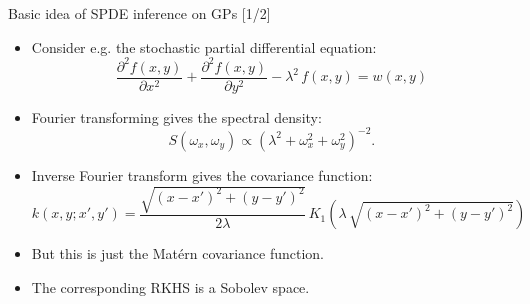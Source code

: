 \documentclass[first=dgreen,second=purple,presentation]{elecslides}
\begin{document}
\begin{frame}{Basic idea of SPDE inference on GPs [1/2]}

\begin{itemize}[<+->]
\item Consider e.g. the \alert{stochastic partial differential equation}:
\begin{equation}
  \frac{\partial^2 f(x,y)}{\partial x^2}
  + \frac{\partial^2 f(x,y)}{\partial y^2} -\lambda^2 \, f(x,y)
  = w(x,y)
\nonumber
\end{equation}

\item Fourier transforming gives the \alert{spectral density}:
%
\begin{equation}
  S(\omega_x,\omega_y)  \propto 
     \left( \lambda^2 + \omega_x^2 + \omega_y^2 \right)^{-2}. 
\nonumber
\end{equation}
%
\item Inverse Fourier transform gives the \alert{covariance function}:
{\small
\begin{equation}
  k(x,y;x',y')
  = \frac{\sqrt{(x-x')^2 + (y-y')^2}}{2\lambda} \, 
  K_1(\lambda \, \sqrt{(x-x')^2 + (y-y')^2})
\nonumber
\end{equation}
}

\item But this is just the \alert{Mat\'ern covariance function}.

\item The corresponding \alert{RKHS} is a \alert{Sobolev space}.

\end{itemize}

\end{frame}
\end{document}
